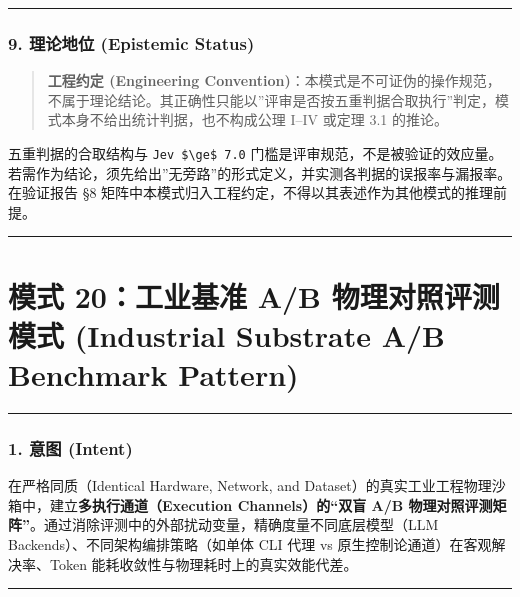\begin{center}\rule{0.5\linewidth}{0.5pt}\end{center}

\subsubsection{9. 理论地位 (Epistemic
Status)}\label{ux7406ux8bbaux5730ux4f4d-epistemic-status-3}

\begin{quote}
\textbf{工程约定 (Engineering
Convention)}：本模式是不可证伪的操作规范，不属于理论结论。其正确性只能以''评审是否按五重判据合取执行''判定，模式本身不给出统计判据，也不构成公理
I--IV 或定理 3.1 的推论。
\end{quote}

五重判据的合取结构与 \texttt{Jev\ \$\textbackslash{}ge\$\ 7.0}
门槛是评审规范，不是被验证的效应量。若需作为结论，须先给出''无旁路''的形式定义，并实测各判据的误报率与漏报率。在验证报告
§8 矩阵中本模式归入工程约定，不得以其表述作为其他模式的推理前提。

\begin{center}\rule{0.5\linewidth}{0.5pt}\end{center}

\section{模式 20：工业基准 A/B 物理对照评测模式 (Industrial Substrate
A/B Benchmark
Pattern)}\label{ux6a21ux5f0f-20ux5de5ux4e1aux57faux51c6-ab-ux7269ux7406ux5bf9ux7167ux8bc4ux6d4bux6a21ux5f0f-industrial-substrate-ab-benchmark-pattern}

\begin{center}\rule{0.5\linewidth}{0.5pt}\end{center}

\subsubsection{1. 意图 (Intent)}\label{ux610fux56fe-intent-19}

在严格同质（Identical Hardware, Network, and
Dataset）的真实工业工程物理沙箱中，建立\textbf{多执行通道（Execution
Channels）的``双盲 A/B
物理对照评测矩阵''}。通过消除评测中的外部扰动变量，精确度量不同底层模型（LLM
Backends）、不同架构编排策略（如单体 CLI 代理 vs
原生控制论通道）在客观解决率、Token
能耗收敛性与物理耗时上的真实效能代差。

\begin{center}\rule{0.5\linewidth}{0.5pt}\end{center}

